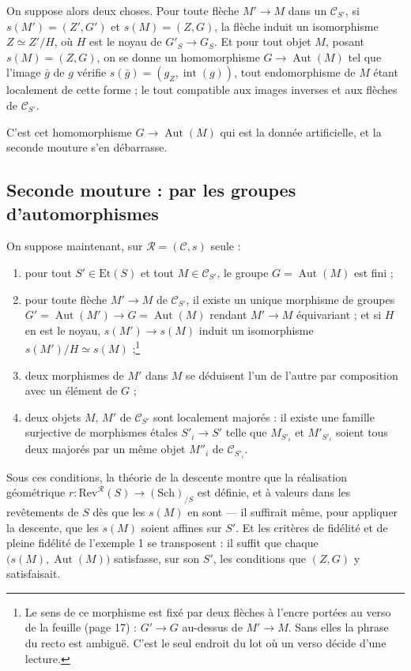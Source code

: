 \documentclass[11pt,a4paper]{article}
\begin{document}
On suppose alors deux choses. Pour toute flèche $M' \to M$ dans un
$\mathcal{C}_{S'}$, si $s(M') = (Z', G')$ et $s(M) = (Z,G)$, la flèche induit
un isomorphisme $Z \simeq Z'/H$, où $H$ est le noyau de $G'_{S} \to G_{S}$.
Et pour tout objet $M$, posant $s(M) = (Z,G)$, on se donne un homomorphisme
$G \to \operatorname{Aut}(M)$ tel que l'image $\bar{g}$ de $g$ vérifie
$s(\bar{g}) = (g_{Z}, \operatorname{int}(g))$, tout endomorphisme de $M$ étant
localement de cette forme ; le tout compatible aux images inverses et aux
flèches de $\mathcal{C}_{S'}$.

C'est cet homomorphisme $G \to \operatorname{Aut}(M)$ qui est la donnée
artificielle, et la seconde mouture s'en débarrasse.

\subsection*{Seconde mouture : par les groupes d'automorphismes}

On suppose maintenant, sur $\mathcal{R} = (\mathcal{C}, s)$ seule :

\begin{enumerate}
  \item[(1)] pour tout $S' \in \mathrm{Et}(S)$ et tout
    $M \in \mathcal{C}_{S'}$, le groupe $G = \operatorname{Aut}(M)$ est fini ;
  \item[(2)] pour toute flèche $M' \to M$ de $\mathcal{C}_{S'}$, il existe un
    unique morphisme de groupes $G' = \operatorname{Aut}(M') \to
    G = \operatorname{Aut}(M)$ rendant $M' \to M$ équivariant ; et si $H$ en est
    le noyau, $s(M') \to s(M)$ induit un isomorphisme
    $s(M')/H \simeq s(M)$ ;\footnote{Le sens de ce morphisme est fixé par deux
    flèches à l'encre portées au verso de la feuille (page 17) :
    $G' \to G$ au-dessus de $M' \to M$. Sans elles la phrase du recto est
    ambiguë. C'est le seul endroit du lot où un verso décide d'une lecture.}
  \item[(3)] deux morphismes de $M'$ dans $M$ se déduisent l'un de l'autre par
    composition avec un élément de $G$ ;
  \item[(4)] deux objets $M$, $M'$ de $\mathcal{C}_{S'}$ sont localement
    majorés : il existe une famille surjective de morphismes étales
    $S'_{i} \to S'$ telle que $M_{S'_{i}}$ et $M'_{S'_{i}}$ soient tous deux
    majorés par un même objet $M''_{i}$ de $\mathcal{C}_{S'_{i}}$.
\end{enumerate}

Sous ces conditions, la théorie de la descente montre que la réalisation
géométrique $r : \mathrm{Rev}^{\mathcal{R}}(S) \to (\mathrm{Sch})_{/S}$ est
définie, et à valeurs dans les revêtements de $S$ dès que les $s(M)$ en sont
--- il suffirait même, pour appliquer la descente, que les $s(M)$ soient
affines sur $S'$. Et les critères de fidélité et de pleine fidélité de
l'exemple 1 se transposent : il suffit que chaque
$\bigl(s(M), \operatorname{Aut}(M)\bigr)$ satisfasse, sur son $S'$, les
conditions que $(Z,G)$ y satisfaisait.
\end{document}
